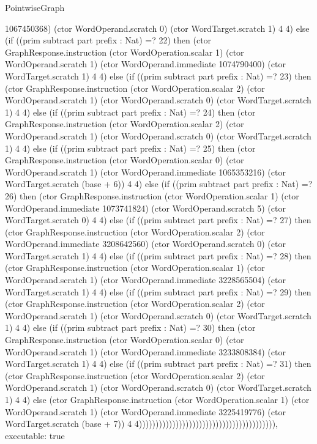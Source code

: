 \begin{lexlean}{PointwiseGraph}
\begin{semanticmodule}
{1067450368) (ctor WordOperand.scratch 0) (ctor WordTarget.scratch 1) 4 4) else (if ((prim subtract part prefix : Nat) =? 22) then (ctor GraphResponse.instruction (ctor WordOperation.scalar 1) (ctor WordOperand.scratch 1) (ctor WordOperand.immediate 1074790400) (ctor WordTarget.scratch 1) 4 4) else (if ((prim subtract part prefix : Nat) =? 23) then (ctor GraphResponse.instruction (ctor WordOperation.scalar 2) (ctor WordOperand.scratch 1) (ctor WordOperand.scratch 0) (ctor WordTarget.scratch 1) 4 4) else (if ((prim subtract part prefix : Nat) =? 24) then (ctor GraphResponse.instruction (ctor WordOperation.scalar 2) (ctor WordOperand.scratch 1) (ctor WordOperand.scratch 0) (ctor WordTarget.scratch 1) 4 4) else (if ((prim subtract part prefix : Nat) =? 25) then (ctor GraphResponse.instruction (ctor WordOperation.scalar 0) (ctor WordOperand.scratch 1) (ctor WordOperand.immediate 1065353216) (ctor WordTarget.scratch (base + 6)) 4 4) else (if ((prim subtract part prefix : Nat) =? 26) then (ctor GraphResponse.instruction (ctor WordOperation.scalar 1) (ctor WordOperand.immediate 1073741824) (ctor WordOperand.scratch 5) (ctor WordTarget.scratch 0) 4 4) else (if ((prim subtract part prefix : Nat) =? 27) then (ctor GraphResponse.instruction (ctor WordOperation.scalar 2) (ctor WordOperand.immediate 3208642560) (ctor WordOperand.scratch 0) (ctor WordTarget.scratch 1) 4 4) else (if ((prim subtract part prefix : Nat) =? 28) then (ctor GraphResponse.instruction (ctor WordOperation.scalar 1) (ctor WordOperand.scratch 1) (ctor WordOperand.immediate 3228565504) (ctor WordTarget.scratch 1) 4 4) else (if ((prim subtract part prefix : Nat) =? 29) then (ctor GraphResponse.instruction (ctor WordOperation.scalar 2) (ctor WordOperand.scratch 1) (ctor WordOperand.scratch 0) (ctor WordTarget.scratch 1) 4 4) else (if ((prim subtract part prefix : Nat) =? 30) then (ctor GraphResponse.instruction (ctor WordOperation.scalar 0) (ctor WordOperand.scratch 1) (ctor WordOperand.immediate 3233808384) (ctor WordTarget.scratch 1) 4 4) else (if ((prim subtract part prefix : Nat) =? 31) then (ctor GraphResponse.instruction (ctor WordOperation.scalar 2) (ctor WordOperand.scratch 1) (ctor WordOperand.scratch 0) (ctor WordTarget.scratch 1) 4 4) else (ctor GraphResponse.instruction (ctor WordOperation.scalar 1) (ctor WordOperand.scratch 1) (ctor WordOperand.immediate 3225419776) (ctor WordTarget.scratch (base + 7)) 4 4))))))))))))))))))))))))))))))))))))))))),
  executable: true
}


\end{semanticmodule}
\end{lexlean}
